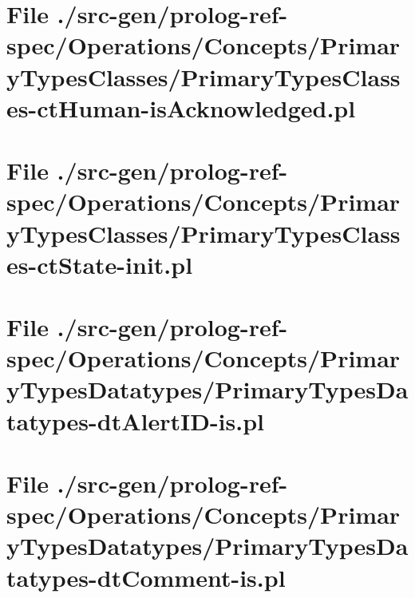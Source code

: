 \section[File /src-gen/prolog-ref-spec.../PrimaryTypesClasses-ctHuman-isAcknowledged.pl]{File ./src-gen/prolog-ref-spec/Operations/Concepts/PrimaryTypesClasses/PrimaryTypesClasses-ctHuman-isAcknowledged.pl}
\scriptsize

\normalsize
	
\section[File /src-gen/prolog-ref-spec/Operations.../PrimaryTypesClasses-ctState-init.pl]{File ./src-gen/prolog-ref-spec/Operations/Concepts/PrimaryTypesClasses/PrimaryTypesClasses-ctState-init.pl}
\scriptsize

\normalsize
	
\section[File /src-gen/prolog-ref-spec.../PrimaryTypesDatatypes-dtAlertID-is.pl]{File ./src-gen/prolog-ref-spec/Operations/Concepts/PrimaryTypesDatatypes/PrimaryTypesDatatypes-dtAlertID-is.pl}
\scriptsize

\normalsize
	
\section[File /src-gen/prolog-ref-spec.../PrimaryTypesDatatypes-dtComment-is.pl]{File ./src-gen/prolog-ref-spec/Operations/Concepts/PrimaryTypesDatatypes/PrimaryTypesDatatypes-dtComment-is.pl}
\scriptsize

\normalsize
	
